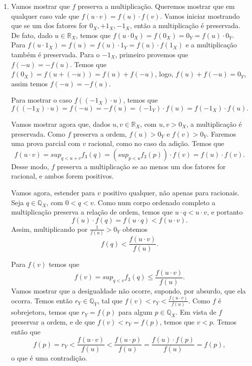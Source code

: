 \documentclass[../main.tex]{subfiles}
\begin{document}
\begin{dem}
\begin{enumerate}
\begin{enumerate}
            \item Vamos mostrar que $f$ preserva a multiplicação.
            Queremos mostrar que em qualquer caso vale que $f(u\cdot v) = f(u) \cdot f(v)$.
            Vamos iniciar mostrando que se um dos fatores for $0_X, +1_X, -1_X$, então a multiplicação é preservada. De fato, dado $u \in \mathbb{R}_X$, temos que
            $f(u \cdot 0_X) = f(0_X) = 0_Y = f(u) \cdot 0_Y$. \\ 
            Para $f(u \cdot 1_X) = f(u) = f(u) \cdot 1_Y = f(u) \cdot f(1_X)$ e a multiplicação também é preservada. Para o $-1_X$, primeiro provemos que $f(-u) = -f(u)$. Temos que $f(0_X) = f(u+(-u)) = f(u) + f(-u)$, logo, $f(u) + f(-u) = 0_Y$, assim temos $f(-u) = -f(u)$. 

            Para mostrar o caso $f((-1_X) \cdot u)$, temos que
            \[ f((-1_X) \cdot u) = f(-u) = -f(u) = (-1_Y) \cdot f(u) = f(-1_X) \cdot f(u). \]

            Vamos mostrar agora que, dados $u,v \in \mathbb{R}_X$, com $u,v > 0_X$, a multiplicação é preservada. Como $f$ preserva a ordem, $f(u) > 0_Y$ e $f(v) > 0_Y$. Faremos uma prova parcial com $v$ racional, como no caso da adição. Temos que
            \[ f(u \cdot v) = sup_{q < u+v}f_3(q) = \left( sup_{p<u}f_3(p) \right) \cdot f(v) = f(u) \cdot f(v). \]
            Desse modo, $f$ preserva a multiplicação se ao menos um dos fatores for racional, e ambos forem positivos.

            Vamos agora, estender para $v$ positivo qualquer, não apenas para racionais. Seja $q \in \mathbb{Q}_X$, com $0 < q < v$. 
            Como num corpo ordenado completo a multiplicação preserva a relação de ordem, temos que $u\cdot q < u\cdot v$, e portanto
            \[ f(u) \cdot f(q) = f(u \cdot q) < f(u \cdot v). \]
            Assim, multiplicando por $\frac{1}{f(u)} > 0_Y$ obtemos
            \[ f(q) < \frac{f(u \cdot  v)}{f(u)} .\]

            Para $f(v)$ temos que
            \[ f(v) = sup_{q<v}f_3(q) \leq \frac{f(u \cdot v)}{f(u)}.\]
            Vamos mostrar que a desigualdade não ocorre, supondo, por absurdo, que ela ocorra. 
            Temos então $r_Y \in \mathbb{Q}_Y$, tal que $f(v) < r_Y < \frac{f(u \cdot v)}{f(u)}$. Como $f$ é sobrejetora, temos que $r_Y = f(p)$ para algum $p \in \mathbb{Q}_X$.
            Em vista de $f$ preservar a ordem, e de que $f(v) < r_Y = f(p)$, temos que $v < p$. Temos então que
            \[ f(p) = r_Y < \frac{f(u \cdot v)}{f(u)} < \frac{f(u \cdot p)}{f(u)} = \frac{f(u) \cdot f(p)}{f(u)} = f(p),\]
            o que é uma contradição.


\end{enumerate}
\end{enumerate}
\end{dem}
\end{document}
